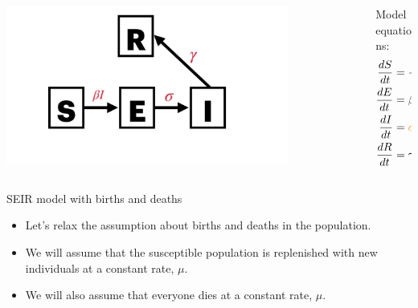 \documentclass[
  ignorenonframetext,
]{beamer}
\begin{document}
\begin{frame}
\begin{columns}[T]
\begin{column}{0.6\textwidth}
\includegraphics[width=0.8\textwidth,height=\textheight]{images/model_diagrams/model_diagrams.008.jpeg}
\end{column}

\begin{column}{0.4\textwidth}
Model equations: \begin{align*}
\frac{dS}{dt} & = -\beta S I \\
\frac{dE}{dt} & = \beta S I - \color{orange}{\sigma E} \\
\frac{dI}{dt} & = \color{orange}{\sigma E} - \gamma I \\
\frac{dR}{dt} & = \gamma I
\end{align*}
\end{column}
\end{columns}
\end{frame}

\begin{frame}
\begin{block}{SEIR model with births and deaths}
\label{seir-model-with-births-and-deaths}
\begin{itemize}
\item
  Let's relax the assumption about births and deaths in the population.
\item
  We will assume that the susceptible population is replenished with new
  individuals at a constant rate, \(\mu\).
\item
  We will also assume that everyone dies at a constant rate, \(\mu\).
\end{itemize}
\end{block}
\end{frame}
\end{document}
